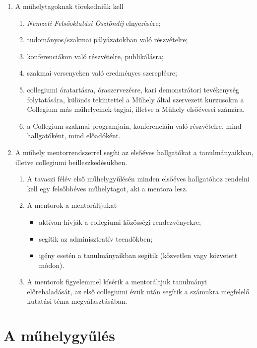 \documentclass{../styles/rulebook}
\begin{document}
\begin{enumerate}
\begin{enumerate}
	\end{enumerate}
\item A műhelytagoknak törekedniük kell
	\begin{enumerate}
		\item \emph{Nemzeti Felsőoktatási Ösztöndíj} elnyerésére;
		\item tudományos/szakmai pályázatokban való részvételre;
		\item konferenciákon való részvételre, publikálásra;
		\item szakmai versenyeken való eredményes szereplésre;
		\item collegiumi óratartásra, óraszervezésre, kari demonstrátori tevékenység folytatására, különös tekintettel a Műhely által szervezett kurzusokra a Collegium más műhelyeinek tagjai, illetve a Műhely elsőévesei számára.
		\item a Collegium szakmai programjain, konferenciáin való részvételre, mind hallgatóként, mind előadóként.
	\end{enumerate}
\item A műhely mentorrendszerrel segíti az elsőéves hallgatókat a tanulmányaikban, illetve collegiumi beilleszkedésükben.
	\begin{enumerate}
		\item A tavaszi félév első műhelygyűlésén minden elsőéves hallgatóhoz rendelni kell egy felsőbbéves műhelytagot, aki a mentora lesz.
		\item A mentorok a mentoráltjukat
			\begin{itemize} 
				\item aktívan hívják a collegiumi közösségi rendezvényekre;
				\item segítik az adminisztratív teendőkben;
				\item igény esetén a tanulmányaikban segítik (közvetlen vagy közvetett módon).
			\end{itemize}
		\item A mentorok figyelemmel kísérik a mentoráltjuk tanulmányi előrehaladását, az első collegiumi évük után segítik a számukra megfelelő kutatási téma megválasztásában.
	\end{enumerate}
\end{enumerate}

\section{A műhelygyűlés}
\end{document}
